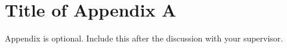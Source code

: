 \chapter{Title of Appendix A}
\label{appendixA}
Appendix is optional. Include this after the discussion with your supervisor. 